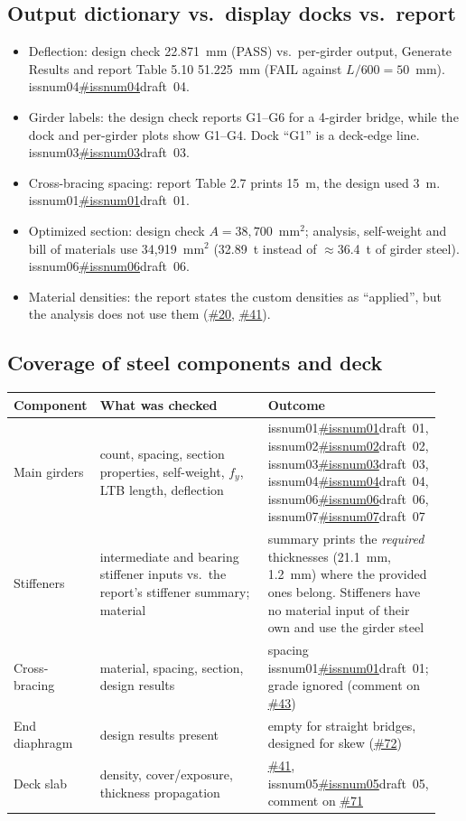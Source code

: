 \documentclass[11pt,a4paper]{article}
\newcommand{\issue}[1]{\ifcsname issnum#1\endcsname\href{https://github.com/Nidhikhare12/OsdagBridge/issues/\csname issnum#1\endcsname}{\#\csname issnum#1\endcsname}\else draft~#1\fi}
\newcommand{\gh}[1]{\href{https://github.com/Nidhikhare12/OsdagBridge/issues/#1}{\##1}}
\begin{document}
\subsection{Output dictionary vs.\ display docks vs.\ report}
\begin{itemize}
\item Deflection: design check 22.871~mm (PASS) vs.\ per-girder output, Generate Results and report Table 5.10 51.225~mm (FAIL against $L/600=50$~mm). \issue{04}.
\item Girder labels: the design check reports G1--G6 for a 4-girder bridge, while the dock and per-girder plots show G1--G4. Dock ``G1'' is a deck-edge line. \issue{03}.
\item Cross-bracing spacing: report Table 2.7 prints 15~m, the design used 3~m. \issue{01}.
\item Optimized section: design check $A=38{,}700$~mm$^2$; analysis, self-weight and bill of materials use 34{,}919~mm$^2$ (32.89~t instead of $\approx$36.4~t of girder steel). \issue{06}.
\item Material densities: the report states the custom densities as ``applied'', but the analysis does not use them (\gh{20}, \gh{41}).
\end{itemize}

\subsection{Coverage of steel components and deck}
\begin{tabular}{@{}>{\raggedright\arraybackslash}p{0.16\linewidth}>{\raggedright\arraybackslash}p{0.40\linewidth}>{\raggedright\arraybackslash}p{0.38\linewidth}@{}}
\toprule
Component & What was checked & Outcome\\
\midrule
Main girders & count, spacing, section properties, self-weight, $f_y$, LTB length, deflection & \issue{01}, \issue{02}, \issue{03}, \issue{04}, \issue{06}, \issue{07}\\
Stiffeners & intermediate and bearing stiffener inputs vs.\ the report's stiffener summary; material & summary prints the \emph{required} thicknesses (21.1~mm, 1.2~mm) where the provided ones belong. Stiffeners have no material input of their own and use the girder steel\\
Cross-bracing & material, spacing, section, design results & spacing \issue{01}; grade ignored (comment on \gh{43})\\
End diaphragm & design results present & empty for straight bridges, designed for skew (\gh{72})\\
Deck slab & density, cover/exposure, thickness propagation & \gh{41}, \issue{05}, comment on \gh{71}\\
\bottomrule
\end{tabular}
\end{document}

